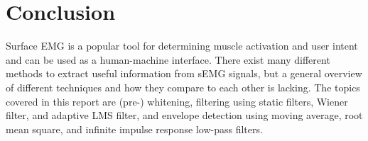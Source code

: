\section{Conclusion}
Surface EMG is a popular tool for determining muscle activation and user intent and can be used as a human-machine interface. There exist many different methods to extract useful information from sEMG signals, but a general overview of different techniques and how they compare to each other is lacking. The topics covered in this report are (pre-) whitening, filtering using static filters, Wiener filter, and adaptive LMS filter, and envelope detection using moving average, root mean square, and infinite impulse response low-pass filters. 